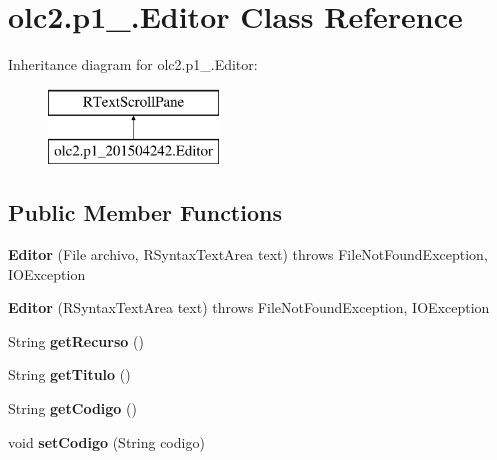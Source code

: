 \hypertarget{classolc2_1_1p1__201504242_1_1_editor}{}\section{olc2.\+p1\+\_.\+Editor Class Reference}
\label{classolc2_1_1p1__201504242_1_1_editor}
Inheritance diagram for olc2.\+p1\+\_.\+Editor\+:\begin{figure}[H]
\begin{center}
\leavevmode
\includegraphics[height=2.000000cm]{classolc2_1_1p1__201504242_1_1_editor}
\end{center}
\end{figure}
\subsection*{Public Member Functions}
\begin{DoxyCompactItemize}
\item 
\mbox{\label{classolc2_1_1p1__201504242_1_1_editor_ae450ebb2ac12b7ca86ec857262234d54}} 
{\bfseries Editor} (File archivo, R\+Syntax\+Text\+Area text)  throws File\+Not\+Found\+Exception, I\+O\+Exception     
\item 
\mbox{\label{classolc2_1_1p1__201504242_1_1_editor_a7d8e9510d153eebf0c72edfa25f6a007}} 
{\bfseries Editor} (R\+Syntax\+Text\+Area text)  throws File\+Not\+Found\+Exception, I\+O\+Exception     
\item 
\mbox{\label{classolc2_1_1p1__201504242_1_1_editor_aec577468b98cbe6c7638f673b7afd60e}} 
String {\bfseries get\+Recurso} ()
\item 
\mbox{\label{classolc2_1_1p1__201504242_1_1_editor_a7072dda437e6315799e3a01911cce0fe}} 
String {\bfseries get\+Titulo} ()
\item 
\mbox{\label{classolc2_1_1p1__201504242_1_1_editor_af7f0afcfb653c45fdf48c25527b513c9}} 
String {\bfseries get\+Codigo} ()
\item 
\mbox{\label{classolc2_1_1p1__201504242_1_1_editor_a2976a68ad6b7656e7345a30e9531654e}} 
void {\bfseries set\+Codigo} (String codigo)
\end{DoxyCompactItemize}


